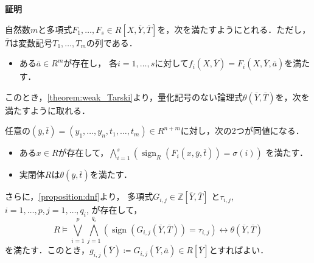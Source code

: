 \documentclass[uplatex, dvipdfmx]{jsarticle}
\makeatletter
\numberwithin{equation}{section}
\renewenvironment{proof}[1][\proofname]{\par
  \pushQED{\qed}%
  \normalfont \topsep6\p@\@plus6\p@\relax
  \trivlist
  \item\relax
  {\bfseries
  #1\@addpunct{.}}\hspace\labelsep\ignorespaces
}{
  \popQED\endtrivlist\@endpefalse
}
\newcommand{\Z}{\mathbb{Z}}
\DeclareMathOperator{\sign}{sign}
\theoremstyle{definition}
\renewcommand{\proofname}{\textbf{証明}}
\makeatother
\begin{document}
\begin{proof}
     自然数$m$と多項式$F_1, \dots, F_s \in R[X, \overline{Y}, \overline{T}]$を，次を満たすようにとれる．ただし，$\overline{T}$は変数記号$T_1, \dots, T_m$の列である．
     \begin{itemize}     
          \item   
               ある$\overline{a} \in R^m$が存在し，
               各$i=1, \dots, s$に対して$f_i(X,\overline{Y}) = F_i(X,\overline{Y}, \overline{a})$を満たす．
     \end{itemize}
     このとき，\cref{theorem:weak_Tarski}より，量化記号のない論理式$\theta(\overline{Y}, \overline{T})$を，次を満たすように取れる．

     任意の$(\overline{y}, \overline{t}) = (y_1, \dots, y_n, t_1, \dots, t_m) \in R^{n+m}$に対し，次の2つが同値になる．
     \begin{itemize}
          \item
               ある$x \in R$が存在して，$\bigwedge_{i=1}^s (\sign_R(F_i(x,\overline{y}, \overline{t})) = \sigma(i))$ を満たす．
          \item
               実閉体$R$は$\theta(\overline{y}, \overline{t})$を満たす．         
     \end{itemize}
     さらに，\cref{proposition:dnf}より，%
     多項式$G_{i,j} \in \Z[\overline{Y}, \overline{T}]$ と$\tau_{i,j}$, $i=1, \dots, p, j=1, \dots, q_i$, が存在して，
     \begin{equation}
          R \models
          \bigvee_{i=1}^p \bigwedge_{j=1}^{q_i}(\sign(G_{i,j}(\overline{Y}, \overline{T}))=\tau_{i,j})
          \leftrightarrow \theta(\overline{Y},\overline{T})
     \end{equation}
     を満たす．このとき，$g_{i,j}(\overline{Y}) \coloneqq G_{i,j}(\overline{Y}, \overline{a}) \in R[\overline{Y}]$とすればよい．
\end{proof}
\end{document}
